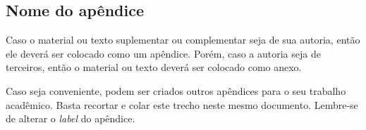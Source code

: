 
\begin{apendicesenv}
    
    \chapter{Nome do apêndice}
    \label{chap:apendiceA}
    
    Caso o material ou texto suplementar ou complementar seja de sua autoria, então ele deverá ser colocado como um apêndice. Porém, caso a autoria seja de terceiros, então o material ou texto deverá ser colocado como anexo.
    
    Caso seja conveniente, podem ser criados outros apêndices para o seu trabalho acadêmico. Basta recortar e colar este trecho neste mesmo documento. Lembre-se de alterar o \textit{label} do apêndice.
    
    
    
\end{apendicesenv}
